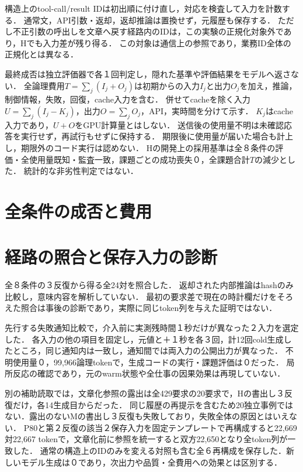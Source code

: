\documentclass[uplatex,a4paper,twocolumn,10pt]{jsarticle}
\begin{document}
構造上のtool-call/result IDは初出順に付け直し，対応を検査して入力を計数する．
通常文，API引数・返却，返却推論は置換せず，元履歴も保存する．
ただし不正引数の呼出しを文章へ戻す経路内のIDは，この実験の正規化対象外であり，Hでも入力差が残り得る．
この対象は通信上の参照であり，業務ID全体の正規化\cite{canonical}とは異なる．

最終成否は独立評価器で各１回判定し，隠れた基準や評価結果をモデルへ返さない．
全論理費用$T=\sum_j(I_j+O_j)$は初期からの入力$I_j$と出力$O_j$を加え，推論，制御情報，失敗，回復，cache入力を含む．
併せてcacheを除く入力$U=\sum_j(I_j-K_j)$，出力$O=\sum_jO_j$，API，実時間を分けて示す．
$K_j$はcache入力であり，$U+O$をGPU計算量とはしない．
送信後の使用量不明は未確認応答を実行せず，再試行もせずに保持する．
期限後に使用量が届いた場合も計上し，期限外のコード実行は認めない．
Hの開発上の採用基準は全８条件の評価・全使用量既知・監査一致，課題ごとの成功喪失０，全課題合計$T$の減少とした．
統計的な非劣性判定ではない．

\section{全条件の成否と費用}




\section{経路の照合と保存入力の診断}
全８条件の３反復から得る全24対を照合した．
返却された内部推論はhashのみ比較し，意味内容を解析していない．
最初の要求差で現在の時計欄だけをそろえた照合は事後の診断であり，実際に同じtoken列を与えた証明ではない．


先行する失敗通知比較で，介入前に実測残時間１秒だけが異なった２入力を選定した．
各入力の他の項目を固定し，元値と＋１秒を各３回，計12回cold生成したところ，同じ通知内は一致し，通知間では両入力の公開出力が異なった．
不明使用量０，99,966論理tokenで，生成コードの実行・課題評価は０だった．
局所反応の確認であり，元のwarm状態や全仕事の因果効果は再現していない．

別の補助読取では，文章化参照の露出は全429要求の20要求で，Hの書出し３反復だけ，各14生成目からだった．
同じ履歴の再提示を含むため20独立事例ではない．露出のないMの書出し３反復も失敗しており，失敗全体の原因とはいえない．
P80と第２反復の該当２保存入力を固定テンプレートで再構成すると22,669対22,667 tokenで，文章化前に参照を統一すると双方22,650となり全token列が一致した．
通常の構造上のIDのみを変える対照も含む全６再構成を保存した．新しいモデル生成は０であり，次出力や品質・全費用への効果とは区別する．
\end{document}
